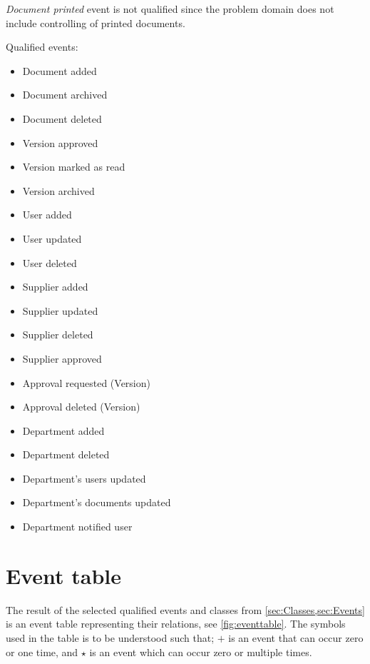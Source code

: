 \textit{Document printed} event is not qualified since the problem domain does not include controlling of printed documents.

Qualified events:
\begin{multicols}{2}
	\begin{itemize}
	\item Document added
	\item Document archived
	\item Document deleted
	\item Version approved
	\item Version marked as read
	\item Version archived
	\item User added
	\item User updated
	\item User deleted
	\item Supplier added
	\item Supplier updated
	\item Supplier deleted
	\item Supplier approved
	\item Approval requested (Version)
	\item Approval deleted (Version)
	\item Department added
	\item Department deleted
	\item Department's users updated
	\item Department's documents updated
	\item Department notified user
	\end{itemize}
\end{multicols}

\section{Event table}\label{sec:EventTable}
The result of the selected qualified events and classes from \cref{sec:Classes,sec:Events} is an event table representing their relations, see \cref{fig:eventtable}.
The symbols used in the table is to be understood such that; $+$ is an event that can occur zero or one time, and $\star$ is an event which can occur zero or multiple times.

